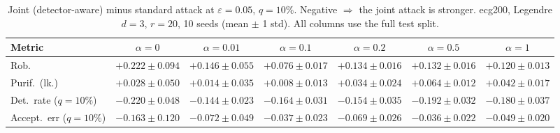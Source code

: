 \begin{table}[htbp]
  \centering
  \small
  \begin{tabular}{@{}lcccccc@{}}
    \toprule
    Metric & $\alpha{=}0$ & $\alpha{=}0.01$ & $\alpha{=}0.1$ & $\alpha{=}0.2$ & $\alpha{=}0.5$ & $\alpha{=}1$ \\
    \midrule
    Rob. & $+0.222 \pm 0.094$ & $+0.146 \pm 0.055$ & $+0.076 \pm 0.017$ & $+0.134 \pm 0.016$ & $+0.132 \pm 0.016$ & $+0.120 \pm 0.013$ \\
    Purif.\ (lk.) & $+0.028 \pm 0.050$ & $+0.014 \pm 0.035$ & $+0.008 \pm 0.013$ & $+0.034 \pm 0.024$ & $+0.064 \pm 0.012$ & $+0.042 \pm 0.017$ \\
    Det.\ rate ($q{=}10\%$) & $-0.220 \pm 0.048$ & $-0.144 \pm 0.023$ & $-0.164 \pm 0.031$ & $-0.154 \pm 0.035$ & $-0.192 \pm 0.032$ & $-0.180 \pm 0.037$ \\
    Accept.\ err ($q{=}10\%$) & $-0.163 \pm 0.120$ & $-0.072 \pm 0.049$ & $-0.037 \pm 0.023$ & $-0.069 \pm 0.026$ & $-0.036 \pm 0.022$ & $-0.049 \pm 0.020$ \\
    \bottomrule
  \end{tabular}
  \caption{Joint (detector-aware) minus standard attack at $\varepsilon=0.05$, $q{=}10\%$. Negative $\Rightarrow$ the joint attack is stronger. ecg200, Legendre $d{=}3$, $r{=}20$, 10 seeds (mean $\pm$ 1 std). All columns use the full test split.}
  \label{tab:ecg200_joint_r20_eps0.05}
\end{table}
